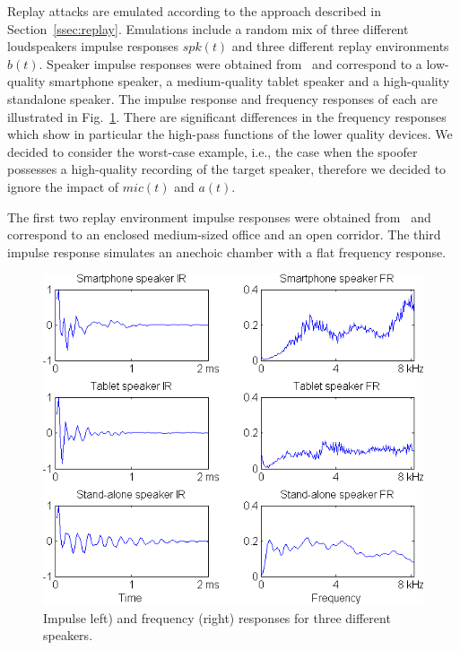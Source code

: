 
Replay attacks are emulated according to the approach described in Section~\ref{ssec:replay}.
Emulations include a random mix of three different loudspeakers impulse responses $spk(t)$ and three different replay environments $b(t)$.  Speaker impulse responses were obtained from~\cite{Brown2014} and correspond to a low-quality smartphone speaker, a medium-quality tablet speaker and a high-quality standalone speaker.  The impulse response and frequency responses of each are illustrated in Fig.~\ref{fig::IRs}.  There are significant differences in the frequency responses which show in particular the high-pass functions of the lower quality devices. We decided to consider the worst-case example, i.e., the case when the spoofer possesses a high-quality recording of the target speaker, therefore we decided to ignore the impact of $mic(t)$ and $a(t)$.

The first two replay environment impulse responses were obtained from~\cite{Jeub2009} and correspond to an enclosed medium-sized office and an open corridor.   %
The third impulse response simulates an anechoic chamber with a flat frequency response. 


\begin{figure}
	\centering
	\includegraphics[width=1\linewidth]{Figs/IRs.png}
	\caption{Impulse left) and frequency (right) responses for three different speakers.} %
	\label{fig::IRs}
\end{figure}


